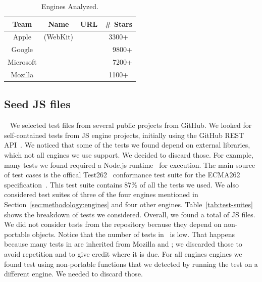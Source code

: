 \documentclass[10pt,conference,anonymous]{IEEEtran}
\begin{document}
\begin{table}[t]
  \centering
  \caption{\label{tab:engines}Engines Analyzed.}
  \begin{tabular}{cccr}
    \toprule
    Team & Name & URL & \# Stars \\
    \midrule
    Apple & \jsc{} (WebKit) & \cite{jsc2018repo} & \multicolumn{1}{c}{3300+} \\
    Google & \veight{} & \cite{v82018repo} & 9800+ \\
    Microsoft & \chakra{} & \cite{chakra2018repo} & 7200+ \\
    Mozilla & \smonkey{} & \cite{spidermonkey2018repo} & \multicolumn{1}{c}{1100+} \\
   \bottomrule     
  \end{tabular}
\end{table}

\subsection{Seed JS files\label{sec:seeds}}~
We selected test files from several public projects from GitHub. We
looked for self-contained tests from JS engine projects, initially
using the GitHub REST API~\cite{github-rest-api}. We noticed that some
of the tests we found depend on external libraries, which not all
engines we use support. We decided to discard those. For example, many
tests we found required a Node.js runtime~\cite{node} for
execution. The main source of test cases is the offical
Test262~\cite{tc39-github} conformance test suite for the ECMA262
specification~\cite{ecmas262-spec}. This test suite contains 87\% of
all the tests we used. We also considered test suites of three of the
four engines mentioned in Section~\ref{sec:methodology:engines} and
four other engines. Table~\ref{tab:test-suites} shows the breakdown of
tests we considered. Overall, we found a total of \totfiles{} JS
files. We did not consider tests from the \chakra{} repository because
they depend on non-portable objects. Notice that the number of tests
in \veight\ is low. That happens because many tests in \veight{} are
inherited from Mozilla and \jsc{}; we discarded those to avoid
repetition and to give credit where it is due. For all engines engines
we found test using non-portable functions that we detected by running
the test on a different engine. We needed to discard those.
\end{document}
